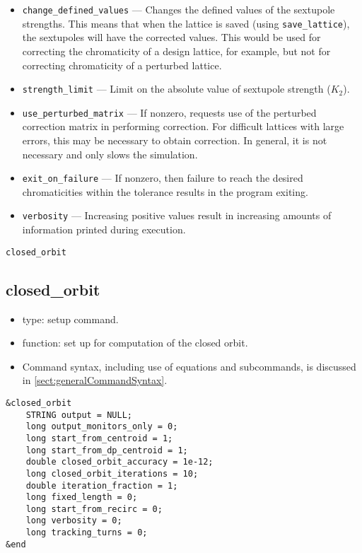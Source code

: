 \documentclass[11pt]{article}
\begin{document}
\begin{itemize}
\item \verb|change_defined_values| --- Changes the defined values of the sextupole strengths.
This means that when the lattice is saved (using \verb|save_lattice|), the sextupoles will
have the corrected values.  This would be used for correcting the chromaticity of a design
lattice, for example, but not for correcting chromaticity of a perturbed lattice.
\item \verb|strength_limit| --- Limit on the absolute value of sextupole strength ($K_2$).
\item \verb|use_perturbed_matrix| --- If nonzero, requests use of the perturbed correction matrix in
performing correction.  For difficult lattices with large errors, this may be necessary
to obtain correction.  In general, it is not necessary and only slows the simulation.
\item \verb|exit_on_failure| --- If nonzero, then failure to reach the desired chromaticities within the
  tolerance results in the program exiting.
\item \verb|verbosity| --- Increasing positive values result in increasing amounts of information printed during
  execution.
\end{itemize}

\newpage
\begin{center}{\Large\verb|closed_orbit|}\end{center}
\subsection{closed\_orbit \label{subsec:closedorbit}}

\begin{itemize}
\item type: setup command.
\item function: set up for computation of the closed orbit.
\item Command syntax, including use of equations and subcommands, is discussed in \ref{sect:generalCommandSyntax}.
\end{itemize}

\begin{verbatim}
&closed_orbit
    STRING output = NULL;
    long output_monitors_only = 0;
    long start_from_centroid = 1;
    long start_from_dp_centroid = 1;
    double closed_orbit_accuracy = 1e-12;
    long closed_orbit_iterations = 10;
    double iteration_fraction = 1;
    long fixed_length = 0;
    long start_from_recirc = 0;
    long verbosity = 0;
    long tracking_turns = 0;
&end
\end{verbatim}
\end{document}
